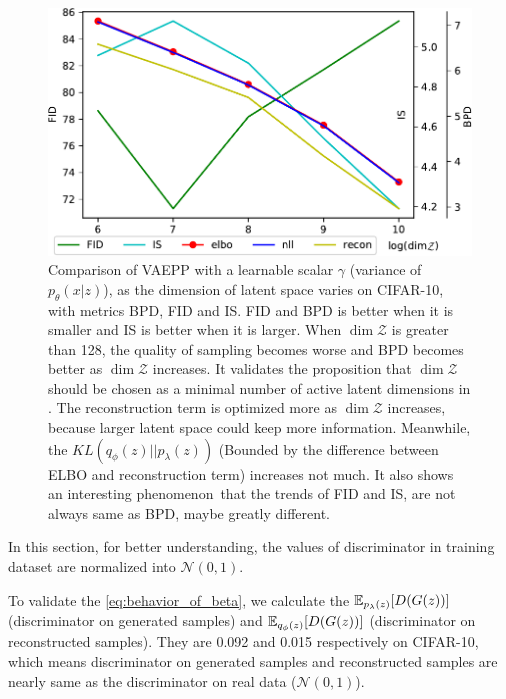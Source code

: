 \begin{figure}[tb]
	\centering
	\includegraphics[width=1.0\columnwidth]{../dist.strip/z_dim}
	\caption{
	Comparison of VAEPP with a learnable scalar $\gamma$ (variance of $p_\theta(x|z)$), as the dimension of latent space varies on CIFAR-10, with metrics BPD, FID and IS. FID and BPD is better when it is smaller and IS is better when it is larger. When $\dim \mathcal{Z}$ is greater than 128, the quality of sampling becomes worse and BPD becomes better as $\dim \mathcal{Z}$ increases. It validates the proposition that $\dim \mathcal{Z}$ should be chosen as a minimal number of active latent dimensions in \protect\cite{dai2019diagnosing}. The reconstruction term is optimized more as $\dim \mathcal{Z}$ increases, because larger latent space could keep more information. Meanwhile, the $KL(q_\phi(z)||p_\lambda(z))$ (Bounded by the difference between ELBO and reconstruction term) increases not much. It also shows an interesting phenomenon that the  trends of FID and IS, are not always same as BPD, maybe greatly different. 
	}
	\label{fig:fid_different_dim}
\end{figure}

In this section, for better understanding, the values of discriminator in training dataset are normalized into $\mathcal{N}(0, 1)$.

To validate the \cref{eq:behavior_of_beta}, we calculate the $\operatorname{\mathbb{E}}_{p_\lambda(z)}[ D(G(z))]$ (discriminator on generated samples) and $\operatorname{\mathbb{E}}_{q_\phi(z)}[ D(G(z))]$ (discriminator on reconstructed samples). They are 0.092 and 0.015 respectively on CIFAR-10, which means discriminator on generated samples and reconstructed samples are nearly same as the discriminator on real data ($\mathcal{N}(0, 1)$). 

